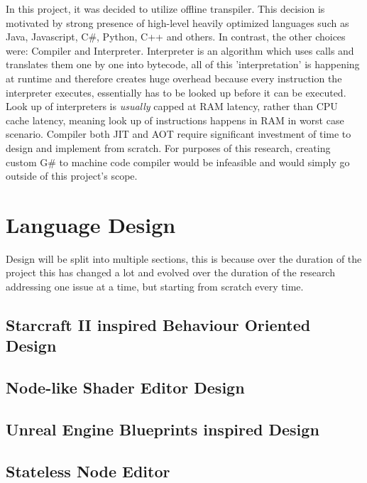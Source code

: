 \documentclass{article}
\begin{document}
In this project, it was decided to utilize offline transpiler. This decision is motivated by strong presence of high-level heavily optimized languages such as Java, Javascript, C\#, Python, C++ and others. In contrast, the other choices were: Compiler and Interpreter.
Interpreter is an algorithm which uses calls and translates them one by one into bytecode, all of this 'interpretation' is happening at runtime and therefore creates huge overhead because every instruction the interpreter executes, essentially has to be looked up before it can be executed. Look up of interpreters is \textit{usually} capped at RAM latency, rather than CPU cache latency, meaning look up of instructions happens in RAM in worst case scenario.
Compiler both JIT and AOT require significant investment of time to design and implement from scratch. For purposes of this research, creating custom G\# to machine code compiler would be infeasible and would simply go outside of this project's scope.








\section{Language Design}
Design will be split into multiple sections, this is because over the duration of the project this has changed a lot and evolved over the duration of the research addressing one issue at a time, but starting from scratch every time.

\subsection{Starcraft II inspired Behaviour Oriented Design}

\subsection{Node-like Shader Editor Design}

\subsection{Unreal Engine Blueprints inspired Design}

\subsection{Stateless Node Editor}
\end{document}
